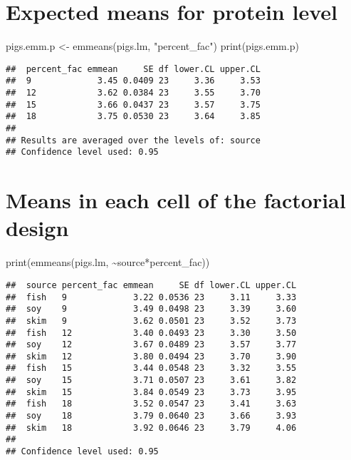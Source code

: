 \documentclass[
]{book}
\newenvironment{Shaded}{\begin{snugshade}}{\end{snugshade}}
\newcommand{\FunctionTok}[1]{\textcolor[rgb]{0.00,0.00,0.00}{#1}}
\newcommand{\NormalTok}[1]{#1}
\newcommand{\OtherTok}[1]{\textcolor[rgb]{0.56,0.35,0.01}{#1}}
\newcommand{\SpecialCharTok}[1]{\textcolor[rgb]{0.00,0.00,0.00}{#1}}
\newcommand{\StringTok}[1]{\textcolor[rgb]{0.31,0.60,0.02}{#1}}
\begin{document}
\hypertarget{expected-means-for-protein-level}{%
\section{Expected means for protein level}\label{expected-means-for-protein-level}}

\begin{Shaded}
\begin{Highlighting}[]
\NormalTok{pigs.emm.p }\OtherTok{\textless{}{-}} \FunctionTok{emmeans}\NormalTok{(pigs.lm, }\StringTok{"percent\_fac"}\NormalTok{)}
\FunctionTok{print}\NormalTok{(pigs.emm.p)}
\end{Highlighting}
\end{Shaded}

\begin{verbatim}
##  percent_fac emmean     SE df lower.CL upper.CL
##  9             3.45 0.0409 23     3.36     3.53
##  12            3.62 0.0384 23     3.55     3.70
##  15            3.66 0.0437 23     3.57     3.75
##  18            3.75 0.0530 23     3.64     3.85
## 
## Results are averaged over the levels of: source 
## Confidence level used: 0.95
\end{verbatim}

\hypertarget{means-in-each-cell-of-the-factorial-design}{%
\section{Means in each cell of the factorial design}\label{means-in-each-cell-of-the-factorial-design}}

\begin{Shaded}
\begin{Highlighting}[]
\FunctionTok{print}\NormalTok{(}\FunctionTok{emmeans}\NormalTok{(pigs.lm, }\SpecialCharTok{\textasciitilde{}}\NormalTok{source}\SpecialCharTok{*}\NormalTok{percent\_fac))}
\end{Highlighting}
\end{Shaded}

\begin{verbatim}
##  source percent_fac emmean     SE df lower.CL upper.CL
##  fish   9             3.22 0.0536 23     3.11     3.33
##  soy    9             3.49 0.0498 23     3.39     3.60
##  skim   9             3.62 0.0501 23     3.52     3.73
##  fish   12            3.40 0.0493 23     3.30     3.50
##  soy    12            3.67 0.0489 23     3.57     3.77
##  skim   12            3.80 0.0494 23     3.70     3.90
##  fish   15            3.44 0.0548 23     3.32     3.55
##  soy    15            3.71 0.0507 23     3.61     3.82
##  skim   15            3.84 0.0549 23     3.73     3.95
##  fish   18            3.52 0.0547 23     3.41     3.63
##  soy    18            3.79 0.0640 23     3.66     3.93
##  skim   18            3.92 0.0646 23     3.79     4.06
## 
## Confidence level used: 0.95
\end{verbatim}
\end{document}
